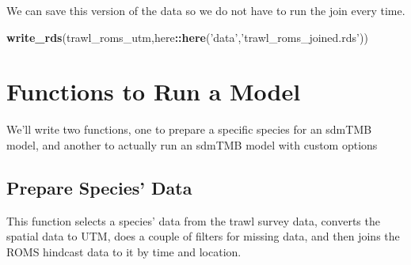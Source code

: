 \documentclass[
]{article}
\newenvironment{Shaded}{\begin{snugshade}}{\end{snugshade}}
\newcommand{\CommentTok}[1]{\textcolor[rgb]{0.56,0.35,0.01}{\textit{#1}}}
\newcommand{\ControlFlowTok}[1]{\textcolor[rgb]{0.13,0.29,0.53}{\textbf{#1}}}
\newcommand{\DataTypeTok}[1]{\textcolor[rgb]{0.13,0.29,0.53}{#1}}
\newcommand{\DecValTok}[1]{\textcolor[rgb]{0.00,0.00,0.81}{#1}}
\newcommand{\KeywordTok}[1]{\textcolor[rgb]{0.13,0.29,0.53}{\textbf{#1}}}
\newcommand{\NormalTok}[1]{#1}
\newcommand{\OperatorTok}[1]{\textcolor[rgb]{0.81,0.36,0.00}{\textbf{#1}}}
\newcommand{\StringTok}[1]{\textcolor[rgb]{0.31,0.60,0.02}{#1}}
\begin{document}
We can save this version of the data so we do not have to run the join
every time.

\begin{Shaded}
\begin{Highlighting}[]
\KeywordTok{write_rds}\NormalTok{(trawl_roms_utm,here}\OperatorTok{::}\KeywordTok{here}\NormalTok{(}\StringTok{'data'}\NormalTok{,}\StringTok{'trawl_roms_joined.rds'}\NormalTok{))}
\end{Highlighting}
\end{Shaded}

\hypertarget{functions-to-run-a-model}{%
\section{Functions to Run a Model}\label{functions-to-run-a-model}}

We'll write two functions, one to prepare a specific species for an
sdmTMB model, and another to actually run an sdmTMB model with custom
options

\hypertarget{prepare-species-data}{%
\subsection{Prepare Species' Data}\label{prepare-species-data}}

This function selects a species' data from the trawl survey data,
converts the spatial data to UTM, does a couple of filters for missing
data, and then joins the ROMS hindcast data to it by time and location.

\begin{Shaded}
\end{Shaded}
\end{document}
